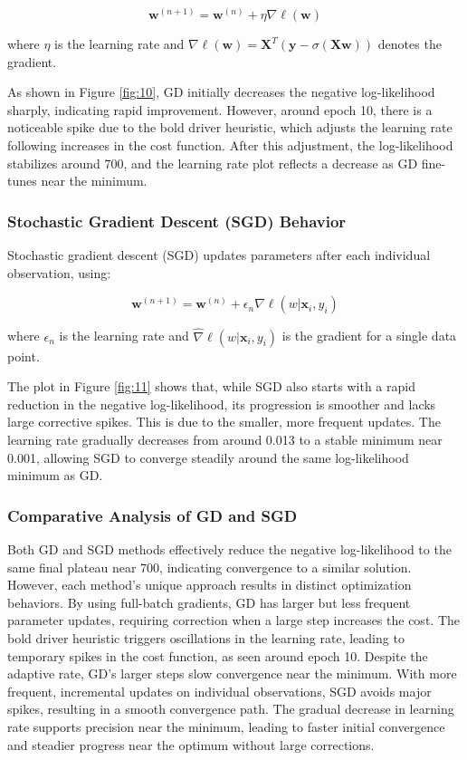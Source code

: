\documentclass[a4paper,oneside,bibliography=totoc]{scrartcl}
\begin{document}
\begin{equation}
    \mathbf{w}^{(n+1)} = \mathbf{w}^{(n)} + \eta \nabla \ell(\mathbf{w})
\end{equation}

where $\eta$ is the learning rate and $\nabla \ell(\mathbf{w}) = \mathbf{X}^T (\mathbf{y} - \sigma(\mathbf{X} \mathbf{w}))$ denotes the gradient.

As shown in Figure \ref{fig:10}, GD initially decreases the negative log-likelihood sharply, indicating rapid improvement. However, around epoch 10, there is a noticeable spike due to the bold driver heuristic, which adjusts the learning rate following increases in the cost function. After this adjustment, the log-likelihood stabilizes around 700, and the learning rate plot reflects a decrease as GD fine-tunes near the minimum.

\subsubsection{Stochastic Gradient Descent (SGD) Behavior}
Stochastic gradient descent (SGD) updates parameters after each individual observation, using:

\begin{equation}
    \mathbf{w}^{(n+1)} = \mathbf{w}^{(n)} + \epsilon_n \hat{\nabla} \ell(w|\mathbf{x}_i, y_i)
\end{equation}

where $\epsilon_n$ is the learning rate and $\hat{\nabla} \ell(w|\mathbf{x}_i, y_i)$ is the gradient for a single data point.

The plot in Figure \ref{fig:11} shows that, while SGD also starts with a rapid reduction in the negative log-likelihood, its progression is smoother and lacks large corrective spikes. This is due to the smaller, more frequent updates. The learning rate gradually decreases from around 0.013 to a stable minimum near 0.001, allowing SGD to converge steadily around the same log-likelihood minimum as GD.


\subsubsection{Comparative Analysis of GD and SGD}

Both GD and SGD methods effectively reduce the negative log-likelihood to the same final plateau near 700, indicating convergence to a similar solution. However, each method’s unique approach results in distinct optimization behaviors. By using full-batch gradients, GD has larger but less frequent parameter updates, requiring correction when a large step increases the cost. The bold driver heuristic triggers oscillations in the learning rate, leading to temporary spikes in the cost function, as seen around epoch 10. Despite the adaptive rate, GD’s larger steps slow convergence near the minimum. With more frequent, incremental updates on individual observations, SGD avoids major spikes, resulting in a smooth convergence path. The gradual decrease in learning rate supports precision near the minimum, leading to faster initial convergence and steadier progress near the optimum without large corrections.
\end{document}
